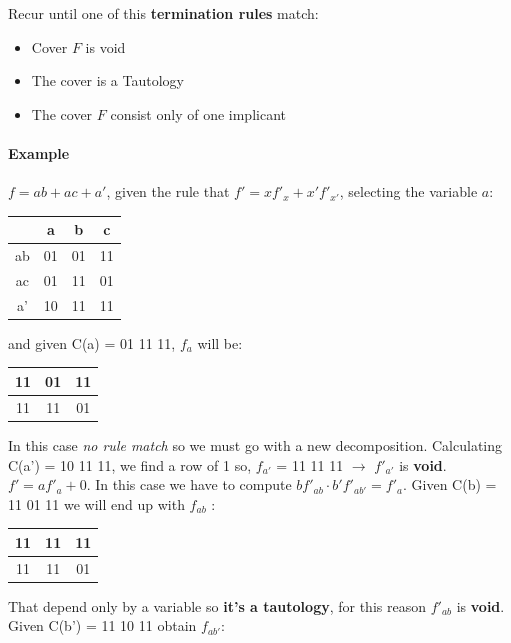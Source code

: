 Recur until one of this \textbf{termination rules} match:

\begin{itemize}
	\item Cover $F$ is void 
	\item The cover is a Tautology
	\item The cover $F$ consist only of one implicant
\end{itemize}


\paragraph{Example} $f = ab + ac + a'$, given the rule that $f' = xf'_{x} + x'f'_{x'}$, selecting the variable $a$:

\begin{center}
	\begin{tabular}{c || c | c | c}
		{} & a & b & c \\ \hline \hline
		ab & 01 & 01 & 11\\ \hline
		ac & 01 & 11 & 01\\ \hline 
		a' & 10 & 11 & 11
	\end{tabular}
\end{center}

and given C(a) = 01 11 11, $f_{a}$ will be:

\begin{center}
	\begin{tabular}{ c | c | c}
		11 & 01 & 11\\ \hline
		11 & 11 & 01\\ 
	\end{tabular}
\end{center}

In this case \textit{no rule match } so we must go with a new decomposition. Calculating  C(a') = 10 11 11, we find a row of 1 so, $f_{a'}$ = 11 11 11 $\rightarrow$ $f'_{a'}$ is \textbf{void}. $f' = af'_{a} + 0 $. In this case we have to compute $bf'_{ab} \cdot b'f'_{ab'} = f'_{a}$. Given C(b) = 11 01 11 we will end up with $f_{ab}$ :

\begin{center}
	\begin{tabular}{ c | c | c}
		11 & 11 & 11\\ \hline
		11 & 11 & 01\\ 
	\end{tabular}
\end{center}

That depend only by a variable so \textbf{it's a tautology}, for this reason $f'_{ab}$ is \textbf{void}. Given C(b') = 11 10 11 obtain $f_{ab'}$: 

